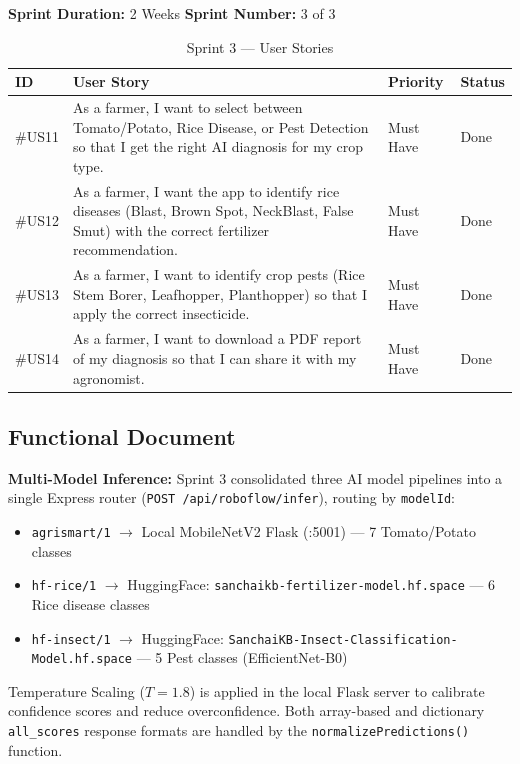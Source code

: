 \documentclass[12pt,a4paper]{report}
\begin{document}
\medskip
\textbf{Sprint Duration:} 2 Weeks \hfill \textbf{Sprint Number:} 3 of 3

\begin{table}[H]
\centering
\caption{Sprint 3 --- User Stories}
\label{tab:sprint3_us}
\renewcommand{\arraystretch}{1.4}
\begin{tabular}{|p{1.4cm}|p{7.8cm}|p{2.4cm}|p{1.8cm}|}
\hline
\textbf{ID} & \textbf{User Story} & \textbf{Priority} & \textbf{Status} \\
\hline
\#US11 & As a farmer, I want to select between Tomato/Potato, Rice Disease, or Pest Detection so that I get the right AI diagnosis for my crop type. & Must Have & Done \\
\hline
\#US12 & As a farmer, I want the app to identify rice diseases (Blast, Brown Spot, NeckBlast, False Smut) with the correct fertilizer recommendation. & Must Have & Done \\
\hline
\#US13 & As a farmer, I want to identify crop pests (Rice Stem Borer, Leafhopper, Planthopper) so that I apply the correct insecticide. & Must Have & Done \\
\hline
\#US14 & As a farmer, I want to download a PDF report of my diagnosis so that I can share it with my agronomist. & Must Have & Done \\
\hline
\end{tabular}
\end{table}

\subsection{Functional Document}

\textbf{Multi-Model Inference:} Sprint 3 consolidated three AI model pipelines into a single Express router (\texttt{POST /api/roboflow/infer}), routing by \texttt{modelId}:
\begin{itemize}
    \item \texttt{agrismart/1} $\rightarrow$ Local MobileNetV2 Flask (:5001) --- 7 Tomato/Potato classes
    \item \texttt{hf-rice/1} $\rightarrow$ HuggingFace: \texttt{sanchaikb-fertilizer-model.hf.space} --- 6 Rice disease classes
    \item \texttt{hf-insect/1} $\rightarrow$ HuggingFace: \texttt{SanchaiKB-Insect-Classification-Model.hf.space} --- 5 Pest classes (EfficientNet-B0)
\end{itemize}

Temperature Scaling ($T = 1.8$) is applied in the local Flask server to calibrate confidence scores and reduce overconfidence. Both array-based and dictionary \texttt{all\_scores} response formats are handled by the \texttt{normalizePredictions()} function.
\end{document}
